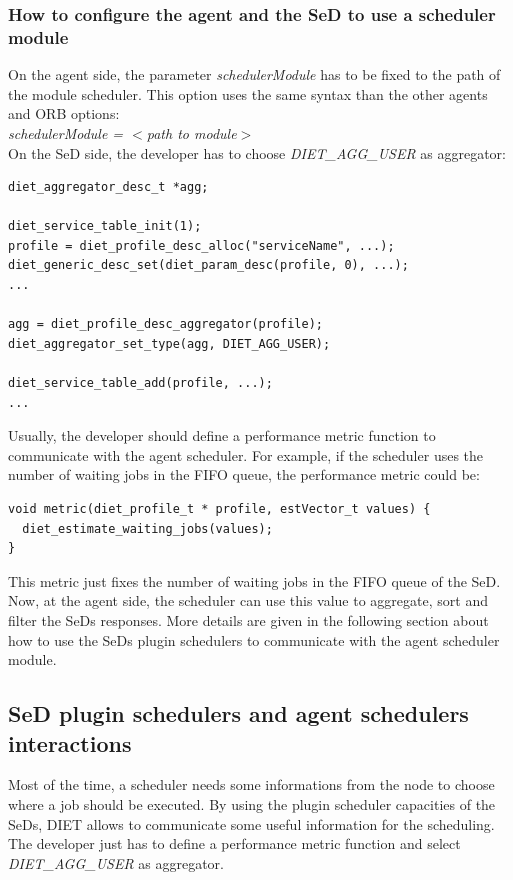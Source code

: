 \subsubsection{How to configure the agent and the SeD to use a scheduler module}
On the agent side, the parameter \textit{schedulerModule} has to be fixed to
the path of the module scheduler. This option uses the same syntax than the
other agents and ORB options:\\
\indent\textit{schedulerModule = $<$path to module$>$}\\
On the SeD side, the developer has to choose \textit{DIET\_AGG\_USER} as
aggregator:
\begin{verbatim}
diet_aggregator_desc_t *agg;

diet_service_table_init(1);
profile = diet_profile_desc_alloc("serviceName", ...);
diet_generic_desc_set(diet_param_desc(profile, 0), ...);
...
 
agg = diet_profile_desc_aggregator(profile); 
diet_aggregator_set_type(agg, DIET_AGG_USER);

diet_service_table_add(profile, ...);
...
\end{verbatim}
Usually, the developer should define a performance metric function to
communicate with the agent scheduler. For example, if the scheduler uses
the number of waiting jobs in the FIFO queue, the performance metric
could be:
\begin{verbatim}
void metric(diet_profile_t * profile, estVector_t values) {
  diet_estimate_waiting_jobs(values);
}
\end{verbatim}
This metric just fixes the number of waiting jobs in the FIFO queue of the
SeD. Now, at the agent side, the scheduler can use this value to aggregate,
sort and filter the SeDs responses. More details are given in the following
section about how to use the SeDs plugin schedulers to communicate with the
agent scheduler module.

\subsection{SeD plugin schedulers and agent schedulers interactions}
Most of the time, a scheduler needs some informations from the node to choose
where a job should be executed. By using the plugin scheduler capacities of
the SeDs, DIET allows to communicate some useful information for the 
scheduling. The developer just has to define a performance metric function
and select \textit{DIET\_AGG\_USER} as aggregator.

